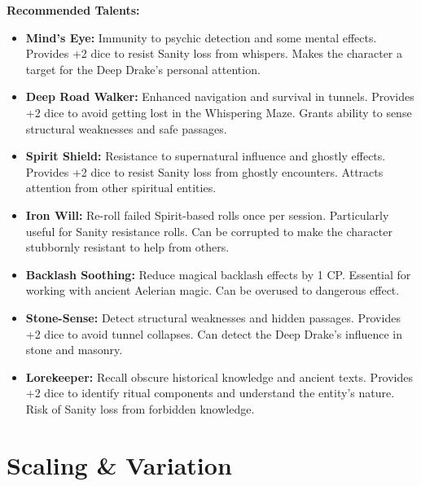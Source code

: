 \documentclass[11pt]{article}
\begin{document}
\textbf{Recommended Talents:}
\begin{itemize}
\item \textbf{Mind's Eye:} Immunity to psychic detection and some mental effects. Provides +2 dice to resist Sanity loss from whispers. Makes the character a target for the Deep Drake's personal attention.
\item \textbf{Deep Road Walker:} Enhanced navigation and survival in tunnels. Provides +2 dice to avoid getting lost in the Whispering Maze. Grants ability to sense structural weaknesses and safe passages.
\item \textbf{Spirit Shield:} Resistance to supernatural influence and ghostly effects. Provides +2 dice to resist Sanity loss from ghostly encounters. Attracts attention from other spiritual entities.
\item \textbf{Iron Will:} Re-roll failed Spirit-based rolls once per session. Particularly useful for Sanity resistance rolls. Can be corrupted to make the character stubbornly resistant to help from others.
\item \textbf{Backlash Soothing:} Reduce magical backlash effects by 1 CP. Essential for working with ancient Aelerian magic. Can be overused to dangerous effect.
\item \textbf{Stone-Sense:} Detect structural weaknesses and hidden passages. Provides +2 dice to avoid tunnel collapses. Can detect the Deep Drake's influence in stone and masonry.
\item \textbf{Lorekeeper:} Recall obscure historical knowledge and ancient texts. Provides +2 dice to identify ritual components and understand the entity's nature. Risk of Sanity loss from forbidden knowledge.
\end{itemize}

\section{Scaling \& Variation}
\end{document}
